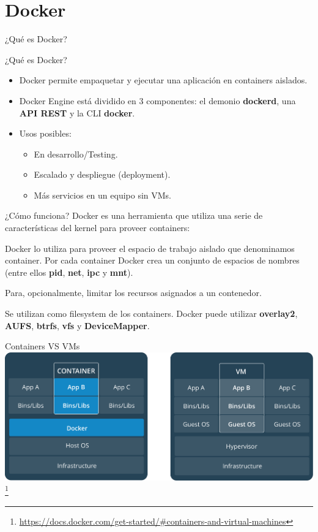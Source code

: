 \section{Docker}
\begin{frame}
  \vfill
  ¿Qué es Docker?
  \vfill
\end{frame}

\begin{frame}{¿Qué es Docker?}
  \begin{itemize}[<+->]
    \item Docker permite empaquetar y ejecutar una aplicación en containers aislados.
    \item Docker Engine está dividido en 3 componentes: el demonio
      \textbf{dockerd}, una \textbf{API REST} y la CLI \textbf{docker}.
    \item Usos posibles:
      \begin{itemize}[<+->]
        \item En desarrollo/Testing.
        \item Escalado y despliegue (deployment).
        \item Más servicios en un equipo sin VMs.
      \end{itemize}
  \end{itemize}
\end{frame}


\begin{frame}{¿Cómo funciona?}
  Docker es una herramienta que utiliza una serie de características del kernel
  para proveer containers:
  \begin{description}[<+->]
    \item[Namespaces:] Docker lo utiliza para proveer el espacio de trabajo
      aislado que denominamos container. Por cada container Docker crea un
      conjunto de espacios de nombres (entre ellos \textbf{pid}, \textbf{net},
      \textbf{ipc} y \textbf{mnt}).
    \item[Control groups:] Para, opcionalmente, limitar los recursos asignados
      a un contenedor.
    \item[Union file systems:] Se utilizan como filesystem de los containers.
        Docker puede utilizar \textbf{overlay2}, \textbf{AUFS},
        \textbf{btrfs}, \textbf{vfs} y \textbf{DeviceMapper}.
  \end{description}
\end{frame}

\begin{frame}{Containers VS VMs}
    \includegraphics[width=\linewidth]{imagenes/containervsvm}
    \footnote{\url{https://docs.docker.com/get-started/\#containers-and-virtual-machines}}
\end{frame}

